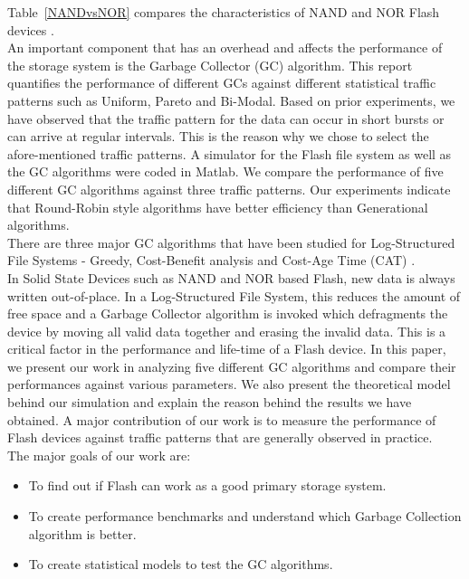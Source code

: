 Table~\ref{NANDvsNOR} compares the characteristics of NAND and NOR Flash devices \cite{Toshiba}. 
\\

An important component that has an overhead and affects the performance of the storage system is the Garbage Collector (GC) algorithm. This report quantifies the performance of different GCs against different statistical traffic patterns such as Uniform, Pareto and Bi-Modal. Based on prior experiments, we have observed that the traffic pattern for the data can occur in short bursts or can arrive at regular intervals. This is the reason why we chose to select the afore-mentioned traffic patterns. A simulator for the Flash file system as well as the GC algorithms were coded in Matlab. We compare the performance of five different GC algorithms against three traffic patterns. Our experiments indicate that Round-Robin style algorithms have better efficiency than Generational algorithms.\\

There are three major GC algorithms that have been studied for Log-Structured File Systems - Greedy, Cost-Benefit analysis and Cost-Age Time (CAT) \cite{Menon98, Kwon07}. \\

In Solid State Devices such as NAND and NOR based Flash, new data is always written out-of-place. In a Log-Structured File System, this reduces the amount of free space and a Garbage Collector algorithm is invoked which defragments the device by moving all valid data together and erasing the invalid data. This is a critical factor in the performance and life-time of a Flash device. In this paper, we present our work in analyzing five different GC algorithms and compare their performances against various parameters. We also present the theoretical model behind our simulation and explain the reason behind the results we have obtained. A major contribution of our work is to measure the performance of Flash devices against traffic patterns that are generally observed in practice. \\
The major goals of our work are:
\begin{itemize}
\item To find out if Flash can work as a good primary storage system. 
\item To create performance benchmarks and understand which Garbage Collection algorithm is better. 
\item To create statistical models to test the GC algorithms.
\end{itemize}

